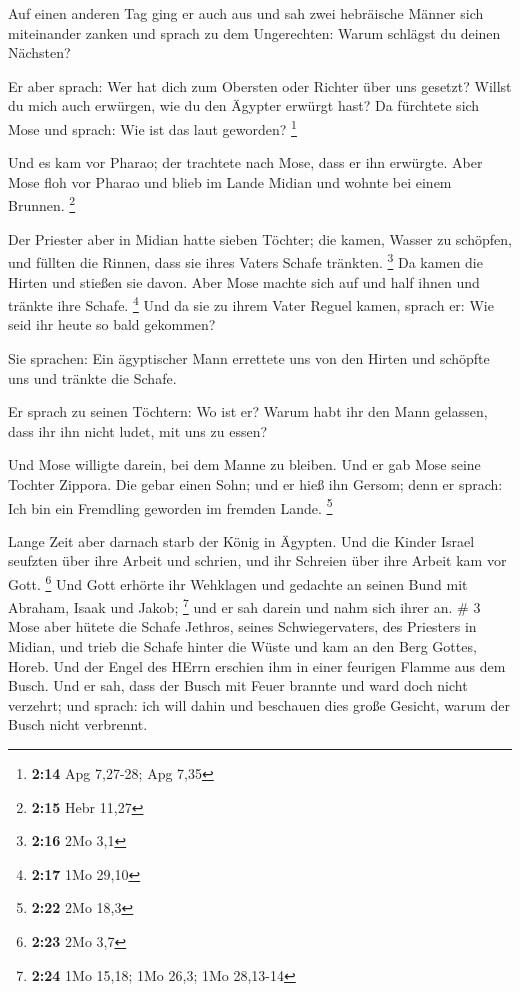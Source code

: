  Auf einen anderen Tag ging er auch aus und sah zwei
hebräische Männer sich miteinander zanken und sprach zu dem Ungerechten:
Warum schlägst du deinen Nächsten?

 Er aber sprach: Wer hat dich zum Obersten oder Richter
über uns gesetzt? Willst du mich auch erwürgen, wie du den Ägypter
erwürgt hast? Da fürchtete sich Mose und sprach: Wie ist das laut
geworden? \footnote{\textbf{2:14} Apg 7,27-28; Apg 7,35}

 Und es kam vor Pharao; der trachtete nach Mose, dass er
ihn erwürgte. Aber Mose floh vor Pharao und blieb im Lande Midian und
wohnte bei einem Brunnen. \footnote{\textbf{2:15} Hebr 11,27}

 Der Priester aber in Midian hatte sieben Töchter; die
kamen, Wasser zu schöpfen, und füllten die Rinnen, dass sie ihres Vaters
Schafe tränkten. \footnote{\textbf{2:16} 2Mo 3,1}  Da kamen
die Hirten und stießen sie davon. Aber Mose machte sich auf und half
ihnen und tränkte ihre Schafe. \footnote{\textbf{2:17} 1Mo 29,10}
 Und da sie zu ihrem Vater Reguel kamen, sprach er: Wie
seid ihr heute so bald gekommen?

 Sie sprachen: Ein ägyptischer Mann errettete uns von den
Hirten und schöpfte uns und tränkte die Schafe.

 Er sprach zu seinen Töchtern: Wo ist er? Warum habt ihr
den Mann gelassen, dass ihr ihn nicht ludet, mit uns zu essen?

 Und Mose willigte darein, bei dem Manne zu bleiben. Und er
gab Mose seine Tochter Zippora.  Die gebar einen Sohn; und
er hieß ihn Gersom; denn er sprach: Ich bin ein Fremdling geworden im
fremden Lande. \footnote{\textbf{2:22} 2Mo 18,3}

 Lange Zeit aber darnach starb der König in Ägypten. Und
die Kinder Israel seufzten über ihre Arbeit und schrien, und ihr
Schreien über ihre Arbeit kam vor Gott. \footnote{\textbf{2:23} 2Mo 3,7}
 Und Gott erhörte ihr Wehklagen und gedachte an seinen Bund
mit Abraham, Isaak und Jakob; \footnote{\textbf{2:24} 1Mo 15,18; 1Mo
  26,3; 1Mo 28,13-14}  und er sah darein und nahm sich
ihrer an. \# 3  Mose aber hütete die Schafe Jethros, seines
Schwiegervaters, des Priesters in Midian, und trieb die Schafe hinter
die Wüste und kam an den Berg Gottes, Horeb.  Und der Engel
des HErrn erschien ihm in einer feurigen Flamme aus dem Busch. Und er
sah, dass der Busch mit Feuer brannte und ward doch nicht verzehrt;
 und sprach: ich will dahin und beschauen dies große
Gesicht, warum der Busch nicht verbrennt.

